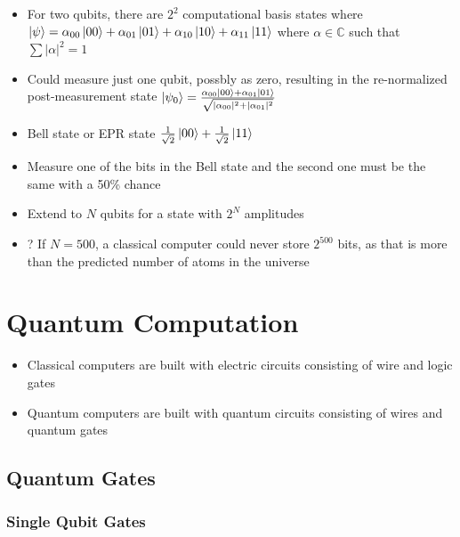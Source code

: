 \documentclass{article}
\begin{document}
        \begin{itemize}
            \item For two qubits, there are $2^2$ computational basis states where $\ket{\psi} = \alpha_{00} \ket{00} + \alpha_{01} \ket{01} + \alpha_{10} \ket{10} + \alpha_{11} \ket{11}$ where $\alpha \in \mathbb{C}$ such that $\sum |\alpha|^2 = 1$
            \item Could measure just one qubit, possbly as zero, resulting in the re-normalized post-measurement state $\ket{\psi_0} = \frac{\alpha_{00} \ket{00} + \alpha_{01} \ket{01}}{\sqrt{|\alpha_{00}|^2 + |\alpha_{01}|^2}}$
            \item Bell state or EPR state $\frac{1}{\sqrt{2}} \ket{00} + \frac{1}{\sqrt{2}} \ket{11}$
            \item Measure one of the bits in the Bell state and the second one must be the same with a 50\% chance
            \item Extend to $N$ qubits for a state with $2^N$ amplitudes
            \item ? If $N = 500$, a classical computer could never store $2^500$ bits, as that is more than the predicted number of atoms in the universe
        \end{itemize}

\section{Quantum Computation}

        \begin{itemize}
            \item Classical computers are built with electric circuits consisting of wire and logic gates
            \item Quantum computers are built with quantum circuits consisting of wires and quantum gates
        \end{itemize}

    \subsection{Quantum Gates}

        \subsubsection{Single Qubit Gates}
\end{document}
